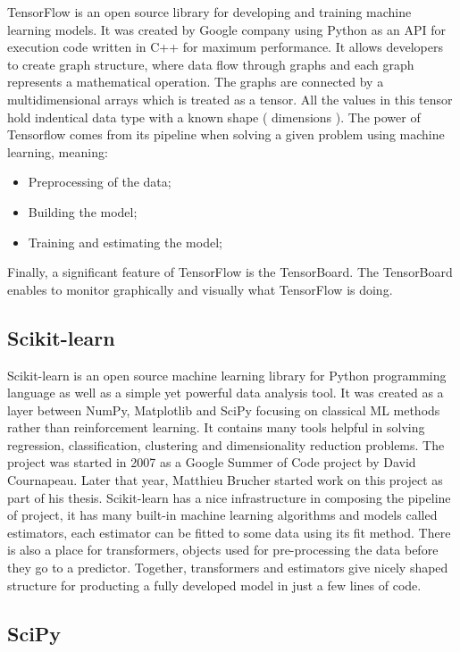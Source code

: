 \documentclass[a4paper,oneside,openright,11pt]{book}
\begin{document}
TensorFlow \cite{tf} is an open source library for developing and training machine learning models. It was created by Google company using Python as an API for execution code written in C++ for maximum performance. It allows developers to create graph structure, where data flow through graphs and each graph represents a mathematical operation. The graphs are connected by a multidimensional arrays which is treated as a tensor. All the values in this tensor hold indentical data type with a known shape ( dimensions ). The power of Tensorflow comes from its pipeline when solving a given problem using machine learning, meaning:

\begin{itemize}
    \item Preprocessing of the data;
    \item Building the model;
    \item Training and estimating the model;
\end{itemize}

Finally, a significant feature of TensorFlow is the TensorBoard. The TensorBoard enables to monitor graphically and visually what TensorFlow is doing.

\subsection{Scikit-learn}

Scikit-learn \cite{sklearn} is an open source machine learning library for Python programming language as well as a simple yet powerful data analysis tool. It was created as a layer between NumPy, Matplotlib and SciPy focusing on classical ML methods rather than reinforcement learning. It contains many tools helpful in solving regression, classification, clustering and dimensionality reduction problems. The project was started in 2007 as a Google Summer of Code project by David Cournapeau. Later that year, Matthieu Brucher started work on this project as part of his thesis. Scikit-learn has a nice infrastructure in composing the pipeline of project, it has many built-in machine learning algorithms and models called estimators, each estimator can be fitted to some data using its fit method. There is also a place for transformers, objects used for pre-processing the data before they go to a predictor. Together, transformers and estimators give nicely shaped structure for producting a fully developed model in just a few lines of code. 


\subsection{SciPy}
\end{document}
